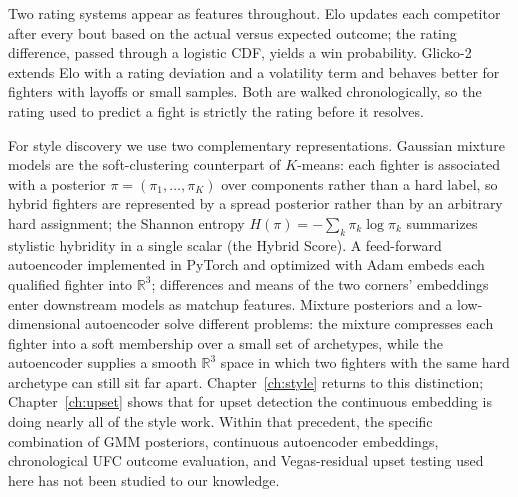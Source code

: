 \documentclass[12pt,oneside]{report}
\begin{document}
Two rating systems appear as features throughout.  Elo
\citep{elo1978rating} updates each competitor after every bout based
on the actual versus expected outcome; the rating difference, passed
through a logistic CDF, yields a win probability.  Glicko-2
\citep{glickman1999parameter,glickman2012example} extends Elo with a
rating deviation and a volatility term and behaves better for
fighters with layoffs or small samples.  Both are walked
chronologically, so the rating used to predict a fight is strictly
the rating before it resolves.

For style discovery we use two complementary representations.
Gaussian mixture models
\citep{bishop2006pattern,hastie2009elements,dempster1977em} are the
soft-clustering counterpart of $K$-means: each fighter is associated
with a posterior \(\pi = (\pi_1, \ldots, \pi_K)\) over components
rather than a hard label, so hybrid fighters are represented by a
spread posterior rather than by an arbitrary hard assignment; the
Shannon entropy \(H(\pi) = -\sum_k \pi_k \log \pi_k\) summarizes stylistic hybridity in a single scalar (the Hybrid Score).
A feed-forward autoencoder \citep{hinton2006reducing} implemented in
PyTorch \citep{paszke2019pytorch} and optimized with Adam
\citep{kingma2014adam} embeds each qualified fighter into
\(\mathbb{R}^3\); differences and means of the two corners' embeddings
enter downstream models as matchup features.  Mixture posteriors
and a low-dimensional autoencoder solve different problems: the
mixture compresses each fighter into a soft membership over a small
set of archetypes, while the autoencoder supplies a smooth
\(\mathbb{R}^3\) space in which two fighters with the same hard
archetype can still sit far apart.  Chapter~\ref{ch:style} returns
to this distinction; Chapter~\ref{ch:upset} shows that for upset
detection the continuous embedding is doing nearly all of the style
work.  Within that precedent, the specific combination of GMM posteriors, continuous
autoencoder embeddings, chronological UFC outcome evaluation, and
Vegas-residual upset testing used here has not been studied to our knowledge.
\end{document}

